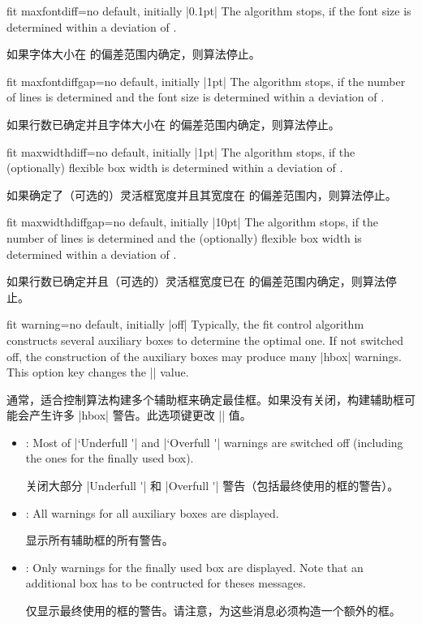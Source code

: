 \begin{docTcbKey}{fit maxfontdiff}{=}{no default, initially |0.1pt|}
The algorithm stops, if the font size is determined within a deviation of
.

如果字体大小在  的偏差范围内确定，则算法停止。
\end{docTcbKey}


\begin{docTcbKey}{fit maxfontdiffgap}{=}{no default, initially |1pt|}
The algorithm stops, if the number of lines is determined and the font size is
determined within a deviation of .

如果行数已确定并且字体大小在  的偏差范围内确定，则算法停止。
\end{docTcbKey}


\begin{docTcbKey}{fit maxwidthdiff}{=}{no default, initially |1pt|}
The algorithm stops, if the (optionally) flexible box width
is determined within a deviation of .

如果确定了（可选的）灵活框宽度并且其宽度在  的偏差范围内，则算法停止。
\end{docTcbKey}


\begin{docTcbKey}{fit maxwidthdiffgap}{=}{no default, initially |10pt|}
The algorithm stops, if the number of lines is determined and the (optionally) flexible box width
is determined within a deviation of .

如果行数已确定并且（可选的）灵活框宽度已在  的偏差范围内确定，则算法停止。
\end{docTcbKey}


\begin{docTcbKey}{fit warning}{=}{no default, initially |off|}
Typically, the fit control algorithm constructs several auxiliary boxes
to determine the optimal one. If not switched off, the construction of
the auxiliary boxes may produce many |hbox| warnings. This option key
changes the |\hbadness| value.

通常，适合控制算法构建多个辅助框来确定最佳框。如果没有关闭，构建辅助框可能会产生许多 |hbox| 警告。此选项键更改 |\hbadness| 值。
  \begin{itemize}
  \item{}: Most of |`Underfull \hbox'| and |`Overfull \hbox'| warnings are
    switched off (including the ones for the finally used box).

    关闭大部分 |Underfull \hbox'| 和 |Overfull \hbox'| 警告（包括最终使用的框的警告）。
  \item{}: All warnings for all auxiliary boxes are displayed.

  显示所有辅助框的所有警告。
  \item{}: Only warnings for the finally used box are displayed.
    Note that an additional box has to be contructed for theses messages.

    仅显示最终使用的框的警告。请注意，为这些消息必须构造一个额外的框。
  \end{itemize}
\end{docTcbKey}
